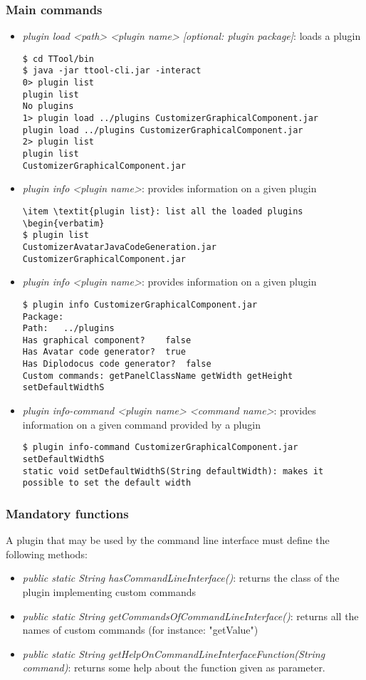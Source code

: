 \documentclass[12pt]{article}
\begin{document}
\subsubsection{Main commands}
\begin{itemize}
\item \textit{plugin load <path> <plugin name> [optional: plugin package]}: loads a plugin
\begin{verbatim}
$ cd TTool/bin
$ java -jar ttool-cli.jar -interact
0> plugin list
plugin list
No plugins
1> plugin load ../plugins CustomizerGraphicalComponent.jar
plugin load ../plugins CustomizerGraphicalComponent.jar
2> plugin list
plugin list
CustomizerGraphicalComponent.jar
\end{verbatim}
\item \textit{plugin info <plugin name>}: provides information on a given plugin
\begin{verbatim}
\item \textit{plugin list}: list all the loaded plugins
\begin{verbatim}
$ plugin list
CustomizerAvatarJavaCodeGeneration.jar
CustomizerGraphicalComponent.jar
\end{verbatim}
\item \textit{plugin info <plugin name>}: provides information on a given plugin
\begin{verbatim}
$ plugin info CustomizerGraphicalComponent.jar
Package:	
Path:	../plugins
Has graphical component?	false
Has Avatar code generator?	true
Has Diplodocus code generator?	false
Custom commands: getPanelClassName getWidth getHeight setDefaultWidthS 
\end{verbatim}

\item \textit{plugin info-command <plugin name> <command name>}: provides information on a given command provided by a plugin
\begin{verbatim}
$ plugin info-command CustomizerGraphicalComponent.jar setDefaultWidthS
static void setDefaultWidthS(String defaultWidth): makes it possible to set the default width
\end{verbatim}
\end{itemize}

\subsubsection{Mandatory functions}
A plugin that may be used by the command line interface must define the following methods:
\begin{itemize}
\item  \textit{public static String hasCommandLineInterface()}: returns the class of the plugin implementing custom commands
\item  \textit{public static String getCommandsOfCommandLineInterface()}: returns all the  names of custom commands (for instance: "getValue")
\item \textit{public static String getHelpOnCommandLineInterfaceFunction(String command)}: returns some help about the function given as parameter.
\end{itemize}
\end{document}
